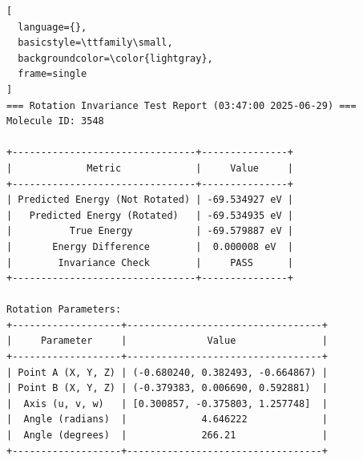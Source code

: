 \documentclass{article}
\begin{document}
\begin{lstlisting}[
  language={},
  basicstyle=\ttfamily\small,
  backgroundcolor=\color{lightgray},
  frame=single
]
=== Rotation Invariance Test Report (03:47:00 2025-06-29) ===
Molecule ID: 3548

+--------------------------------+---------------+
|             Metric             |     Value     |
+--------------------------------+---------------+
| Predicted Energy (Not Rotated) | -69.534927 eV |
|   Predicted Energy (Rotated)   | -69.534935 eV |
|          True Energy           | -69.579887 eV |
|       Energy Difference        |  0.000008 eV  |
|        Invariance Check        |     PASS      |
+--------------------------------+---------------+

Rotation Parameters:
+-------------------+----------------------------------+
|     Parameter     |              Value               |
+-------------------+----------------------------------+
| Point A (X, Y, Z) | (-0.680240, 0.382493, -0.664867) |
| Point B (X, Y, Z) | (-0.379383, 0.006690, 0.592881)  |
|  Axis (u, v, w)   | [0.300857, -0.375803, 1.257748]  |
|  Angle (radians)  |             4.646222             |
|  Angle (degrees)  |             266.21               |
+-------------------+----------------------------------+


\end{lstlisting}
\end{document}
